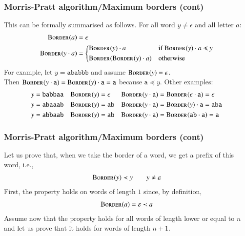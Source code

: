 
%
\begin{frame}
\frametitle{Morris-Pratt algorithm/Maximum borders (cont)}

This can be formally summarised as follows. For all word \(y \neq
\epsilon\) and all letter \(a\):
\[
\begin{aligned}
  \textsc{Border}^{}(a)
 &= \epsilon\\
\textsc{Border}^{}(y \cdot a) &= \left\{
\begin{aligned}
& \textsc{Border}^{}(y) \cdot a
&& \text{if} \; \textsc{Border}^{}(y) \cdot a \preccurlyeq y\\
& \textsc{Border}^{}(\textsc{Border}^{}(y) \cdot a)
&& \text{otherwise}
\end{aligned}
\right.
\end{aligned}
\]
For example, let \(y = \texttt{ababbb}\) and assume \(\textsc{Border}^{}(y)  =
\epsilon\).\\ Then \(\textsc{Border}^{}(y \cdot \texttt{a}) = \textsc{Border}^{}(y) \cdot
\texttt{a} = \texttt{a}\) because \(\texttt{a} \preccurlyeq y\). Other
examples:
\begin{align*}
  y             &= \texttt{babbaa}
& \textsc{Border}^{}(y)  &= \epsilon
& \textsc{Border}^{}(y \cdot \texttt{a}) &= \textsc{Border}^{}(\epsilon \cdot
    \texttt{a}) = \epsilon\\
  y             &= \texttt{abaaab}
& \textsc{Border}^{}(y)  &= \texttt{ab}
& \textsc{Border}^{}(y \cdot \texttt{a}) &= \textsc{Border}^{}(y) \cdot \texttt{a} =
  \texttt{aba}\\
  y             &= \texttt{abbaab}
& \textsc{Border}^{}(y)  &= \texttt{ab}
& \textsc{Border}^{}(y \cdot \texttt{a}) &= \textsc{Border}^{}(\texttt{ab} \cdot
    \texttt{a}) = \texttt{a}
\end{align*}

\end{frame}

%
\begin{frame}
\frametitle{Morris-Pratt algorithm/Maximum borders (cont)}

\label{decreasing_borders_proof}

Let us prove that, when we take the border of a word, we get a prefix
of this word, i.e.,
\[
\textsc{Border}^{}(y) \prec y \qquad y \neq \varepsilon
\]
First, the property holds on words of length \(1\) since, by
definition,
\[
\textsc{Border}^{}(a) = \varepsilon \prec a
\]
Assume now that the property holds for all words of length lower or
equal to \(n\) and let us prove that it holds for words of length
\(n+1\).

\end{frame}

